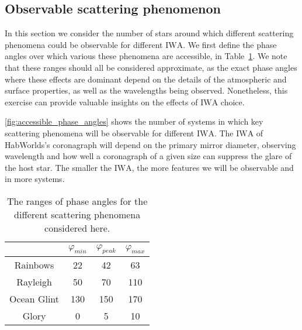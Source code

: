 \documentclass[
    usenatbib,
]{mnras}
\newcommand{\IWA}{\ensuremath{\mathrm{IWA}}}
\newcommand{\hwo}{HabWorlds}
\begin{document}

\subsection{Observable scattering phenomenon}
\label{sec:results_scattering_phenomena}

In this section we consider the number of stars around which different scattering phenomena could be observable for different \IWA{}.
%
We first define the phase angles over which various these phenomena are accessible, in Table~\ref{tab:phase_ranges}.
%
We note that these ranges should all be considered approximate, as the exact phase angles where these effects are dominant depend on the details of the atmospheric and surface properties, as well as the wavelengths being observed.
%
Nonetheless, this exercise can provide valuable insights on the effects of \IWA{} choice. 

\cref{fig:accessible_phase_angles} shows the number of systems in which key scattering phenomena will be observable for different \IWA{}.
%
The \IWA{} of \hwo's coronagraph will depend on the primary mirror diameter, observing wavelength and how well a coronagraph of a given size can suppress the glare of the host star.
%
The smaller the \IWA{}, the more features we will be observable and in more systems. 

\begin{table}
    \centering
    \caption{
        The ranges of phase angles for the different scattering phenomena considered here.
    }
    \label{tab:phase_ranges}
    \begin{tabular}{ c c c c } 
    \toprule
     & $\varphi_{min}$ & $\varphi_{peak}$ & $\varphi_{max}$ \\
    \midrule
    \midrule
    Rainbows & 22 & 42 & 63 \\
    Rayleigh & 50 & 70 & 110 \\
    Ocean Glint & 130 & 150 & 170 \\
    Glory & 0 & 5 & 10 \\
    \bottomrule
    \end{tabular}
\end{table}


\end{document}
